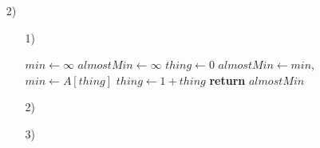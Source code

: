 \documentclass[a4paper, 12pt]{report}
\begin{document}
\begin{enumerate}
{\begin{enumerate}
    \item[3)]{}
\end{enumerate}
}
\item[2)]{
\begin{enumerate}
    \item[1)]{
        \begin{algorithmic}[1]
            \State $min\gets \infty$
            \State $almostMin\gets \infty$
            \State $thing\gets 0$
                    \State $almostMin\gets min$, $min\gets A[thing]$
                \EndIf
                \State $thing\gets 1 + thing$
            \EndWhile\label{euclidendwhile}
            \State \textbf{return} $almostMin$
            \EndProcedure
        \end{algorithmic}
    }
    \item[2)]{}
    \item[3)]{}
\end{enumerate}
}
\end{enumerate}
\end{document}
